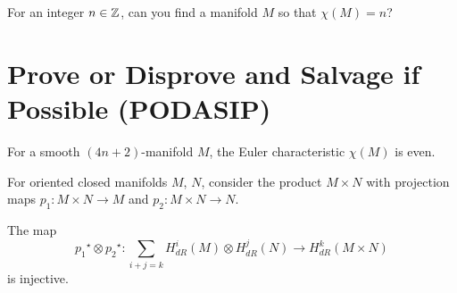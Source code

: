 \documentclass{homework}
\begin{document}
\begin{problem}
 For an integer $n \in \mathbb{Z}$, can you find a manifold $M$ so that $\chi(M) = n$? 
\end{problem}

\section{Prove or Disprove and Salvage if Possible (PODASIP)}

\begin{problem} %
 For a smooth $(4n+2)$-manifold $M$, the Euler characteristic $\chi(M)$ is even.
\end{problem}

\begin{problem}
  For oriented closed manifolds $M$, $N$, consider the product $M \times N$ with projection maps $p_1 : M \times N \to M$ and $p_2 : M \times N \to N$.

  The map
  \[
    {p_1}^\star \otimes {p_2}^\star : \sum_{i+j = k} H_{dR}^i(M) \otimes H_{dR}^j(N) \to H_{dR}^k(M \times N)
  \]
  is injective.
\end{problem}
\end{document}
